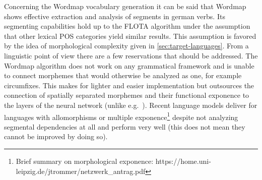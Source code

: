 Concerning the Wordmap vocabulary generation it can be said that Wordmap shows effective extraction and analysis of segments in german verbs.
Its segmenting capabilities hold up to the FLOTA algorithm under the assumption that other lexical POS categories yield similar results.
This assumption is favored by the idea of morphological complexity given in \autoref{sec:target-languages}.
From a linguistic point of view there are a few reservations that should be addressed.
The Wordmap algorithm does not work on any grammatical framework and is unable to connect morphemes that would otherwise be analyzed as one, for example circumfixes.
This makes for lighter and easier implementation but outsources the connection of spatially separated morphemes and their functional exponence to the layers of the neural network (unlike e.g.\ \textcite{BITE}).
Recent language models deliver for languages with allomorphisms or multiple exponence\footnote{Brief summary on morphological exponence: https://home.uni-leipzig.de/jtrommer/netzwerk_antrag.pdf} despite not analyzing segmental dependencies at all and perform very well (this does not mean they cannot be improved by doing so).


